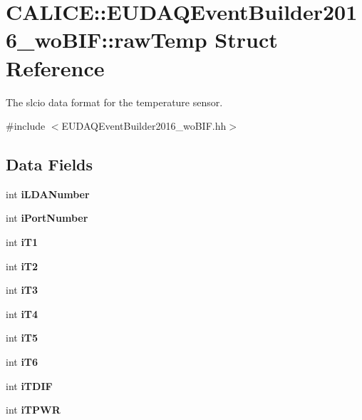 \section{CALICE::EUDAQEventBuilder2016\_\-woBIF::rawTemp Struct Reference}
\label{structCALICE_1_1EUDAQEventBuilder2016__woBIF_1_1rawTemp}


The slcio data format for the temperature sensor.  


{\ttfamily \#include $<$EUDAQEventBuilder2016\_\-woBIF.hh$>$}\subsection*{Data Fields}
\begin{DoxyCompactItemize}
\item 
int {\bfseries iLDANumber}\label{structCALICE_1_1EUDAQEventBuilder2016__woBIF_1_1rawTemp_a7f4eb1483f9f36a45a0bb46be18c9941}

\item 
int {\bfseries iPortNumber}\label{structCALICE_1_1EUDAQEventBuilder2016__woBIF_1_1rawTemp_a02f3bca5a4d64a9cefe89d197a6b00d5}

\item 
int {\bfseries iT1}\label{structCALICE_1_1EUDAQEventBuilder2016__woBIF_1_1rawTemp_a86a557bb634cc3d12062fc358d63a57d}

\item 
int {\bfseries iT2}\label{structCALICE_1_1EUDAQEventBuilder2016__woBIF_1_1rawTemp_a36cde6f44432b535c8fb4cc1cb3b3b8a}

\item 
int {\bfseries iT3}\label{structCALICE_1_1EUDAQEventBuilder2016__woBIF_1_1rawTemp_a556707c287d92730a250c3c041bfc751}

\item 
int {\bfseries iT4}\label{structCALICE_1_1EUDAQEventBuilder2016__woBIF_1_1rawTemp_aee2d6f37dff7dc62db0c44ed17b4d1db}

\item 
int {\bfseries iT5}\label{structCALICE_1_1EUDAQEventBuilder2016__woBIF_1_1rawTemp_ac3f468937709e80c15725bab438fa230}

\item 
int {\bfseries iT6}\label{structCALICE_1_1EUDAQEventBuilder2016__woBIF_1_1rawTemp_afb01fccbb8fc5155b92dc2a5927dd93e}

\item 
int {\bfseries iTDIF}\label{structCALICE_1_1EUDAQEventBuilder2016__woBIF_1_1rawTemp_a112457693b3bff5eff3058368e9abffb}

\item 
int {\bfseries iTPWR}\label{structCALICE_1_1EUDAQEventBuilder2016__woBIF_1_1rawTemp_a27648525d2fff3ecbe8a4848c7601b0b}

\end{DoxyCompactItemize}


